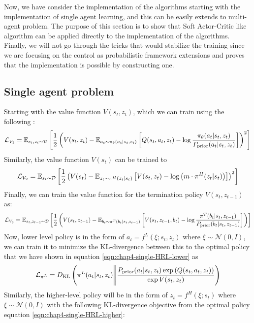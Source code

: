 Now, we have consider the implementation of the algorithms starting with the implementation of single agent learning, and this can be easily extends to multi-agent problem. The purpose of this section is to show that Soft Actor-Critic like algorithm can be applied directly to the implementation of the algorithms. Finally, we will not go through the tricks that would stabilize the training since we are focusing on the control as probabilistic framework extensions and proves that the implementation is possible by constructing one.
 
\subsection{Single agent problem}
Starting with the value function $V(s_t, z_t)$, which we can train using the following :
\begin{equation}
    \mathcal{L}_{V_1} = \mathbb{E}_{s_t, z_t \sim \mathcal{D}} \left[ \frac{1}{2}\left( V(s_t, z_t) - \mathbb{E}_{a_t \sim \pi_\theta(a_t | s_t, z_t)}\left[ Q(s_t, a_t, z_t) - \log \frac{\pi_\theta(a_t | s_t, z_t)}{P_{\text{prior}}(a_t | s_t, z_t)} \right] \right)^2 \right]
\end{equation}
Similarly, the value function $V(s_t)$ can be trained to 
\begin{equation}
    \mathcal{L}_{V_2} = \mathbb{E}_{s_t \sim \mathcal{D}}\left[ \frac{1}{2}\left( V(s_t) - \mathbb{E}_{z_t \sim \pi^H(z_t | s_t)}\left[ V(s_t, z_t) - \log\left( m\cdot \pi^H(z_t | s_t) \right) \right] \right)^2 \right]
\end{equation}
Finally, we can train the value function for the termination policy $V(s_t, z_{t-1})$ as:
\begin{equation}
    \mathcal{L}_{V_3} = \mathbb{E}_{s_t, z_{t-1} \sim \mathcal{D}}\left[ \frac{1}{2}\left( V(s_t, z_{t-1}) - \mathbb{E}_{b_t \sim \pi^T(b_t | s_t, z_{t-1})}\left[  V(s_t, z_{t-1}, b_t) - \log \frac{\pi^T(b_t | s_t, z_{t-1})}{P_{\text{prior}}(b_t | s_t, z_{t-1})} \right]   \right) \right]
\end{equation}
Now, lower level policy is in the form of $a_t = f^L(\xi ; s_t, z_t)$ where $\xi \sim \mathcal{N}(0, I)$, we can train it to minimize the KL-divergence between this to the optimal policy that we have shown in equation \ref{eqn:chap4-single-HRL-lower} as
\begin{equation}
    \mathcal{L}_{\pi^L} = D_{\mathrm{KL}}\left( \pi^L(a_t | s_t, z_t) \Bigg\| \frac{P_{\text{prior}}(a_{t} | s_{t}, z_{t})\exp\left( Q(s_{t}, a_{t}, z_{t}) \right)}{\exp V(s_{t}, z_{t})} \right)
\end{equation}
Similarly, the higher-level policy will be in the form of $z_t = f^H(\xi ; s_t)$ where $\xi \sim \mathcal{N}(0, I)$ with the following KL-divergence objective from the optimal policy equation \ref{eqn:chap4-single-HRL-higher}:
